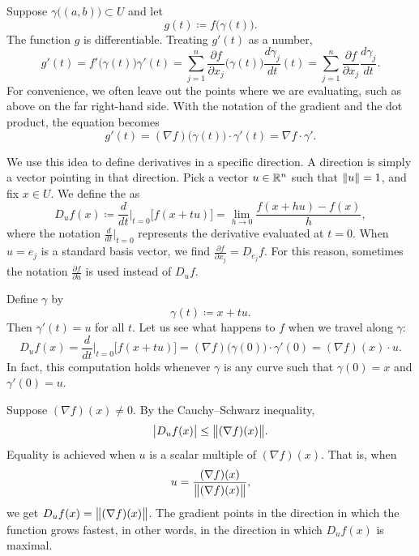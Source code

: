 Suppose $\gamma\bigl((a,b)\bigr) \subset U$ and let
\begin{equation*}
g(t) \coloneqq f\bigl(\gamma(t)\bigr) .
\end{equation*}
The function
$g$ is differentiable. Treating $g'(t)$ as a number,
\begin{equation*}
g'(t) =
f'\bigl(\gamma(t)\bigr) \gamma'(t)
=
\sum_{j=1}^n
\frac{\partial f}{\partial x_j} \bigl(\gamma(t)\bigr)
\frac{d\gamma_j}{dt} (t)
=
\sum_{j=1}^n
\frac{\partial f}{\partial x_j}
\frac{d\gamma_j}{dt} .
\end{equation*}
For convenience,
we often 
leave out the points where we are evaluating,
such as above on the far right-hand side.
With the notation of the gradient and the dot product,
the equation becomes
\begin{equation*}
g'(t) = (\nabla f) \bigl(\gamma(t)\bigr) \cdot \gamma'(t)
= \nabla f \cdot \gamma'.
\end{equation*}

We use this idea to define derivatives in a specific direction.  A direction
is simply a vector pointing in that direction.  Pick a vector $u \in {\mathbb{R}}^n$
such that $\lVert {u} \rVert = 1$, and fix $x \in U$.
We define the
\emph{} as
\begin{equation*}
D_u f (x) \coloneqq \frac{d}{dt}\Big|_{t=0} \bigl[ f(x+tu) \bigr] =
\lim_{h\to 0}
\frac{f(x+hu)-f(x)}{h} ,
\end{equation*}
where the notation
$\frac{d}{dt}\big|_{t=0}$ represents the derivative evaluated at $t=0$.
When $u=e_j$ is a standard basis vector, we find
$\frac{\partial f}{\partial x_j} = D_{e_j} f$.
For this reason, sometimes the notation $\frac{\partial f}{\partial u}$
is used instead of $D_u f$.

Define $\gamma$ by
\begin{equation*}
\gamma(t) \coloneqq x + tu .
\end{equation*}
Then $\gamma'(t) = u$ for all $t$.  
Let us see what happens to $f$ when we travel along $\gamma$:
\begin{equation*}
D_u f (x) =
\frac{d}{dt}\Big|_{t=0} \bigl[ f(x+tu) \bigr] =
(\nabla f) \bigl(\gamma(0)\bigr) \cdot \gamma'(0)
=
(\nabla f) (x) \cdot u .
\end{equation*}
In fact, this computation holds whenever $\gamma$ is any curve such that
$\gamma(0) = x$ and $\gamma'(0) = u$.

Suppose $(\nabla f)(x) \neq 0$.
By the Cauchy--Schwarz inequality,
\begin{equation*}
\bigl\lvert {D_u f(x)} \bigr\rvert \leq \bigl\lVert {(\nabla f)(x)} \bigr\rVert .
\end{equation*}
Equality is achieved when $u$ is a scalar multiple of
$(\nabla f)(x)$.  That is, when
\begin{equation*}
u = 
\frac{(\nabla f)(x)}{\bigl\lVert {(\nabla f)(x)} \bigr\rVert} ,
\end{equation*}
we get $D_u f(x) = \bigl\lVert {(\nabla f)(x)} \bigr\rVert$.
The gradient points in the direction in which the
function grows fastest, in other words,
in the direction in which $D_u f(x)$ is maximal.

